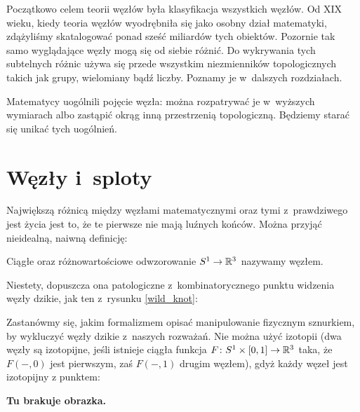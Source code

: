 Początkowo celem teorii węzłów była klasyfikacja wszystkich węzłów.
Od XIX wieku, kiedy teoria węzłów wyodrębniła się jako osobny dział matematyki,
zdążyliśmy skatalogować ponad sześć miliardów tych obiektów.
Pozornie tak samo wyglądające węzły mogą się od siebie różnić.
Do wykrywania tych subtelnych różnic używa się przede wszystkim niezmienników topologicznych takich jak grupy, wielomiany bądź liczby.
Poznamy je w~dalszych rozdziałach.

Matematycy uogólnili pojęcie węzła:
można rozpatrywać je w~wyższych wymiarach albo zastąpić okrąg inną przestrzenią topologiczną.
Będziemy starać się unikać tych uogólnień.

\section{Węzły i~sploty}
Największą różnicą między węzłami matematycznymi oraz tymi z~prawdziwego jest życia jest to, że te pierwsze nie mają luźnych końców.
Można przyjąć nieidealną, naiwną definicję:

\begin{definition}[węzeł]
    Ciągłe oraz różnowartościowe odwzorowanie $S^1 \to \mathbb R^3$ nazywamy węzłem.
\end{definition}

Niestety, dopuszcza ona patologiczne z~kombinatorycznego punktu widzenia węzły dzikie, jak ten z~rysunku \ref{wild_knot}:

Zastanówmy się, jakim formalizmem opisać manipulowanie fizycznym sznurkiem, by wykluczyć węzły dzikie z~naszych rozważań.
Nie można użyć izotopii (dwa węzły są izotopijne, jeśli istnieje ciągła funkcja $F \colon S^1 \times [0, 1] \to \mathbb R^3$ taka, że $F(-, 0)$ jest pierwszym, zaś $F(-,1)$ drugim węzłem), gdyż każdy węzeł jest izotopijny z punktem:

{\color{red}\textbf{Tu brakuje obrazka.}}

